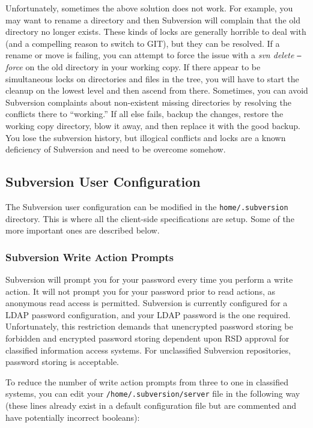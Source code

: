 \documentclass[12pt,letterpaper]{article}
\begin{document}
Unfortunately, sometimes the above solution does not work.  For example, you may want to rename a directory and then Subversion will complain that the old directory no longer exists.  These kinds of locks are generally horrible to deal with (and a compelling reason to switch to GIT), but they can be resolved.  If a rename or move is failing, you can attempt to force the issue with a \emph{svn delete \texttt{--}force} on the old directory in your working copy.  If there appear to be simultaneous locks on directories and files in the tree, you will have to start the cleanup on the lowest level and then ascend from there.  Sometimes, you can avoid Subversion complaints about non-existent missing directories by resolving the conflicts there to ``working.''  If all else fails, backup the changes, restore the working copy directory, blow it away, and then replace it with the good backup.  You lose the subversion history, but illogical conflicts and locks are a known deficiency of Subversion and need to be overcome somehow.

\subsection{Subversion User Configuration}

The Subversion user configuration can be modified in the \verb|home/.subversion| directory.  This is where all the client-side specifications are setup.  Some of the more important ones are described below.

\subsubsection{Subversion Write Action Prompts}

Subversion will prompt you for your password every time you perform a write action.  It will not prompt you for your password prior to read actions, as anonymous read access is permitted.  Subversion is currently configured for a LDAP password configuration, and your LDAP password is the one required.  Unfortunately, this restriction demands that unencrypted password storing be forbidden and encrypted password storing dependent upon RSD approval for classified information access systems.  For unclassified Subversion repositories, password storing is acceptable.

To reduce the number of write action prompts from three to one in classified systems, you can edit your \verb|/home/.subversion/server| file in the following way (these lines already exist in a default configuration file but are commented and have potentially incorrect booleans):
\end{document}
